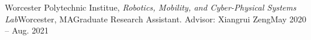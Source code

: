\begin{rSubsection}{Worcester Polytechnic Institue, \textit{Robotics, Mobility, and Cyber-Physical Systems Lab}}{Worcester, MA}{Graduate Research Assistant. Advisor: Xiangrui Zeng}{May 2020 -- Aug. 2021}
\end{rSubsection} 
\vspace{0.1cm}